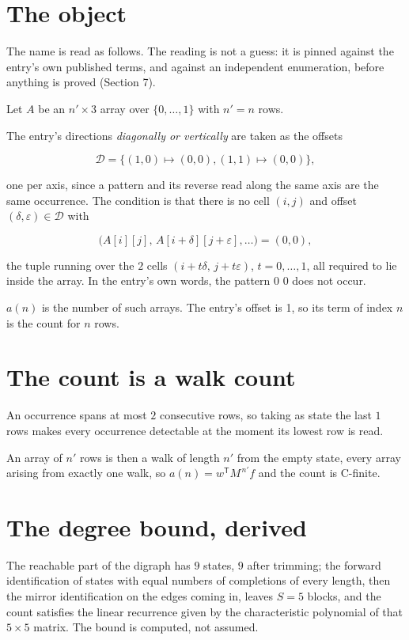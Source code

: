 \documentclass[11pt]{article}
\theoremstyle{definition}
\begin{document}
\section{The object}

The name is read as follows. The reading is not a guess: it is pinned against the entry's own published terms, and against an independent enumeration, before anything is proved (Section 7).

Let $A$ be an $n' \times 3$ array over $\{0,\dots,1\}$ with $n' = n$ rows.

The entry's directions {\itshape diagonally or vertically} are taken as the offsets

\[\mathcal{D} = \{(1,0)\mapsto(0,0), (1,1)\mapsto(0,0)\},\]

one per axis, since a pattern and its reverse read along the same axis are the same occurrence. The condition is that there is no cell $(i,j)$ and offset $(\delta,\varepsilon)\in\mathcal{D}$ with

\[\bigl(A[i][j],\,A[i{+}\delta][j{+}\varepsilon],\dots\bigr) = (0, 0),\]

the tuple running over the $2$ cells $(i+t\delta,\,j+t\varepsilon)$, $t = 0,\dots,1$, all required to lie inside the array. In the entry's own words, the pattern 0 0 does not occur.

$a(n)$ is the number of such arrays. The entry's offset is 1, so its term of index $n$ is the count for $n$ rows.

\section{The count is a walk count}

An occurrence spans at most $2$ consecutive rows, so taking as state the last $1$ rows makes every occurrence detectable at the moment its lowest row is read.

An array of $n'$ rows is then a walk of length $n'$ from the empty state, every array arising from exactly one walk, so $a(n) = w^{\mathsf T}M^{\,n'}f$ and the count is C-finite.

\section{The degree bound, derived}

The reachable part of the digraph has $9$ states, $9$ after trimming; the forward identification of states with equal numbers of completions of every length, then the mirror identification on the edges coming in, leaves $S = 5$ blocks, and the count satisfies the linear recurrence given by the characteristic polynomial of that $5\times5$ matrix. The bound is computed, not assumed.
\end{document}
